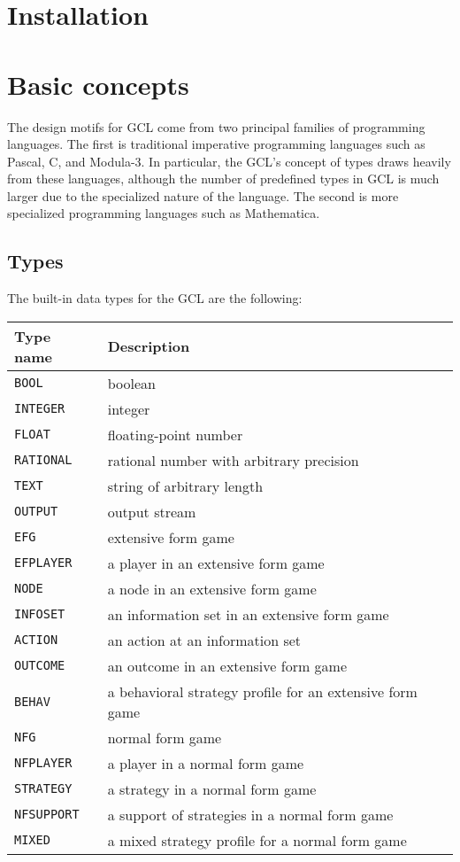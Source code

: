 \section{Installation}

\section{Basic concepts}

The design motifs for GCL come from two principal families of programming
languages.  The first is traditional imperative programming languages
such as Pascal, C, and Modula-3.  In particular, the GCL's concept of
types draws heavily from these languages, although the number of
predefined types in GCL is much larger due to the specialized nature of
the language.  The second is more specialized programming languages such
as Mathematica.  


\subsection{Types}

The built-in data types for the GCL are the following:  

\medskip

\begin{tabular} {|l||l|} \hline
Type name	& Description \\ \hline
{\tt BOOL} 	& boolean \\
{\tt INTEGER} 	& integer \\ 
{\tt FLOAT} 	& floating-point number \\
{\tt RATIONAL} 	& rational number with arbitrary precision \\
{\tt TEXT}	& string of arbitrary length \\
{\tt OUTPUT}	& output stream \\ \hline
{\tt EFG}	& extensive form game \\
{\tt EFPLAYER}	& a player in an extensive form game \\
{\tt NODE}	& a node in an extensive form game \\ 
{\tt INFOSET}	& an information set in an extensive form game \\
{\tt ACTION}	& an action at an information set \\
{\tt OUTCOME}	& an outcome in an extensive form game \\
{\tt BEHAV}	& a behavioral strategy profile for an extensive form game \\ \hline
{\tt NFG}	& normal form game \\
{\tt NFPLAYER}	& a player in a normal form game \\
{\tt STRATEGY}	& a strategy in a normal form game \\
{\tt NFSUPPORT}	& a support of strategies in a normal form game \\
{\tt MIXED}	& a mixed strategy profile for a normal form game \\ \hline
\end{tabular}

